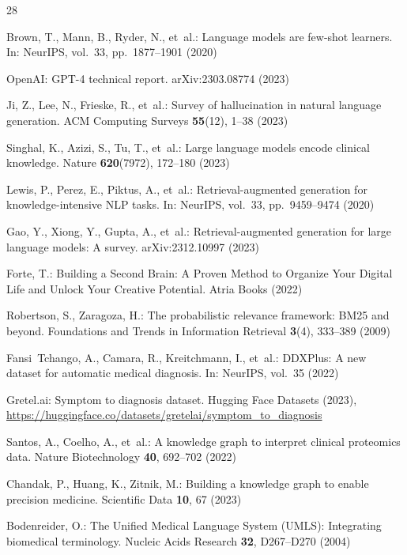 \documentclass[runningheads]{llncs}
\begin{document}
\begin{thebibliography}{28}

Brown, T., Mann, B., Ryder, N., et~al.: Language models are few-shot learners. In: NeurIPS, vol.~33, pp.~1877--1901 (2020)

OpenAI: GPT-4 technical report. arXiv:2303.08774 (2023)

Ji, Z., Lee, N., Frieske, R., et~al.: Survey of hallucination in natural language generation. ACM Computing Surveys \textbf{55}(12), 1--38 (2023)

Singhal, K., Azizi, S., Tu, T., et~al.: Large language models encode clinical knowledge. Nature \textbf{620}(7972), 172--180 (2023)

Lewis, P., Perez, E., Piktus, A., et~al.: Retrieval-augmented generation for knowledge-intensive NLP tasks. In: NeurIPS, vol.~33, pp.~9459--9474 (2020)

Gao, Y., Xiong, Y., Gupta, A., et~al.: Retrieval-augmented generation for large language models: A survey. arXiv:2312.10997 (2023)

Forte, T.: Building a Second Brain: A Proven Method to Organize Your Digital Life and Unlock Your Creative Potential. Atria Books (2022)

Robertson, S., Zaragoza, H.: The probabilistic relevance framework: BM25 and beyond. Foundations and Trends in Information Retrieval \textbf{3}(4), 333--389 (2009)

Fansi~Tchango, A., Camara, R., Kreitchmann, I., et~al.: DDXPlus: A new dataset for automatic medical diagnosis. In: NeurIPS, vol.~35 (2022)

Gretel.ai: Symptom to diagnosis dataset. Hugging Face Datasets (2023), \url{https://huggingface.co/datasets/gretelai/symptom_to_diagnosis}

Santos, A., Coelho, A., et~al.: A knowledge graph to interpret clinical proteomics data. Nature Biotechnology \textbf{40}, 692--702 (2022)

Chandak, P., Huang, K., Zitnik, M.: Building a knowledge graph to enable precision medicine. Scientific Data \textbf{10}, 67 (2023)

Bodenreider, O.: The Unified Medical Language System (UMLS): Integrating biomedical terminology. Nucleic Acids Research \textbf{32}, D267--D270 (2004)


\end{thebibliography}
\end{document}
